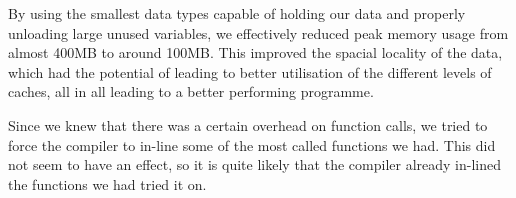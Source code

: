 By using the smallest data types capable of holding our data and properly unloading large unused variables, we effectively reduced peak memory usage from almost 400MB to around 100MB.
This improved the spacial locality of the data, which had the potential of leading to better utilisation of the different levels of caches, all in all leading to a better performing programme.

Since we knew that there was a certain overhead on function calls, we tried to force the compiler to in-line some of the most called functions we had. 
This did not seem to have an effect, so it is quite likely that the compiler already in-lined the functions we had tried it on.

\vspace{12pt}
\begin{threeparttable}[]
    \centering
\end{threeparttable}
